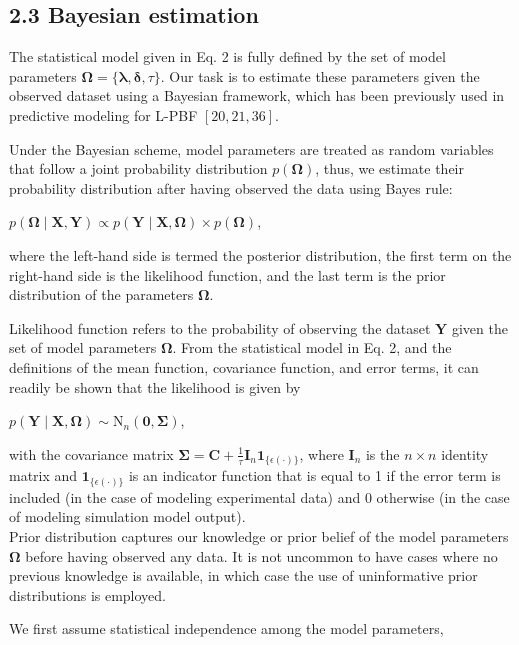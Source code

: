 \documentclass[10pt]{article}
\begin{document}
\subsection*{2.3 Bayesian estimation}
The statistical model given in Eq. 2 is fully defined by the set of model parameters $\boldsymbol{\Omega}=\{\boldsymbol{\lambda}, \boldsymbol{\delta}, \tau\}$. Our task is to estimate these parameters given the observed dataset using a Bayesian framework, which has been previously used in predictive modeling for L-PBF $[20,21,36]$.

Under the Bayesian scheme, model parameters are treated as random variables that follow a joint probability distribution $p(\boldsymbol{\Omega})$, thus, we estimate their probability distribution after having observed the data using Bayes rule:

$p(\boldsymbol{\Omega} \mid \mathbf{X}, \mathbf{Y}) \propto p(\mathbf{Y} \mid \mathbf{X}, \boldsymbol{\Omega}) \times p(\boldsymbol{\Omega})$,

where the left-hand side is termed the posterior distribution, the first term on the right-hand side is the likelihood function, and the last term is the prior distribution of the parameters $\boldsymbol{\Omega}$.

Likelihood function refers to the probability of observing the dataset $\mathbf{Y}$ given the set of model parameters $\boldsymbol{\Omega}$. From the statistical model in Eq. 2, and the definitions of the mean function, covariance function, and error terms, it can readily be shown that the likelihood is given by

$p(\mathbf{Y} \mid \mathbf{X}, \boldsymbol{\Omega}) \sim \mathrm{N}_{n}(\mathbf{0}, \boldsymbol{\Sigma})$,

with the covariance matrix $\boldsymbol{\Sigma}=\mathbf{C}+\frac{1}{\tau} \mathbf{I}_{n} \mathbf{1}_{\{\epsilon(\cdot)\}}$, where $\mathbf{I}_{n}$ is the $n \times n$ identity matrix and $\mathbf{1}_{\{\epsilon(\cdot)\}}$ is an indicator function that is equal to 1 if the error term is included (in the case of modeling experimental data) and 0 otherwise (in the case of modeling simulation model output).\\
Prior distribution captures our knowledge or prior belief of the model parameters $\boldsymbol{\Omega}$ before having observed any data. It is not uncommon to have cases where no previous knowledge is available, in which case the use of uninformative prior distributions is employed.

We first assume statistical independence among the model parameters,
\end{document}
